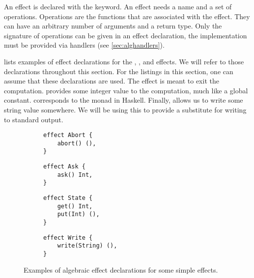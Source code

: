 An effect is declared with the  keyword. An effect needs a name and a set of operations. Operations are the functions that are associated with the effect. They can have an arbitrary number of arguments and a return type. Only the signature of operations can be given in an effect declaration, the implementation must be provided via handlers (see \cref{sec:alghandlers}).

 lists examples of effect declarations for the , ,  and  effects. We will refer to those declarations throughout this section. For the listings in this section, one can assume that these declarations are used. The  effect is meant to exit the computation.  provides some integer value to the computation, much like a global constant.  corresponds to the  monad in Haskell. Finally,  allows us to write some string value somewhere. We will be using this to provide a substitute for writing to standard output.

\begin{figure}[htbp]
    \begin{subfigure}{0.5\textwidth}
        \begin{lstlisting}[style=fancy]
effect Abort {
    abort() (),
}
        \end{lstlisting}
    \end{subfigure}
    \begin{subfigure}{0.5\textwidth}
        \begin{lstlisting}[style=fancy]
effect Ask {
    ask() Int,
}
        \end{lstlisting}
    \end{subfigure}
    \begin{subfigure}{0.5\textwidth}
        \begin{lstlisting}[style=fancy]
effect State {
    get() Int,
    put(Int) (),
}
        \end{lstlisting}
    \end{subfigure}
    \begin{subfigure}{0.5\textwidth}
        \begin{lstlisting}[style=fancy]
effect Write {
    write(String) (),
}
        \end{lstlisting}
    \end{subfigure}
    \caption{Examples of algebraic effect declarations for some simple effects.}
    \label{fig:effect_decls}
\end{figure}

